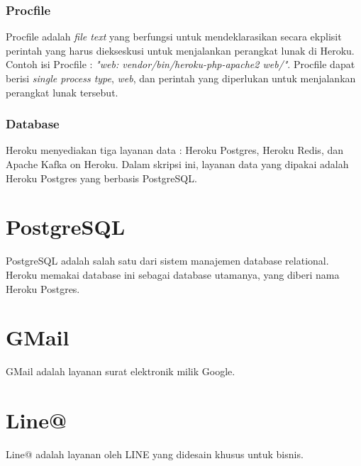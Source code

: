 \subsubsection{Procfile}
Procfile adalah \textit{file text} yang berfungsi untuk mendeklarasikan secara ekplisit perintah yang harus diekseskusi untuk menjalankan perangkat lunak di Heroku. Contoh isi Procfile : \textit{"web: vendor/bin/heroku-php-apache2 web/"}. Procfile dapat berisi \textit{single process type}, \textit{web}, dan perintah yang diperlukan untuk menjalankan perangkat lunak tersebut. \footnotemark[\value{footnote}]

\subsubsection{Database}
Heroku menyediakan tiga layanan data : Heroku Postgres, Heroku Redis, dan Apache Kafka on Heroku. Dalam skripsi ini, layanan data yang dipakai adalah Heroku Postgres yang berbasis PostgreSQL.

\section{PostgreSQL}
\label{sec:PostgreSQL}
PostgreSQL adalah salah satu dari sistem manajemen database relational. Heroku memakai database ini sebagai database utamanya, yang diberi nama Heroku Postgres.

\section{GMail}
\label{sec:GMail}
GMail adalah layanan surat elektronik milik Google.

\section{Line@}
\label{sec:Line@}
Line@ adalah layanan oleh LINE yang didesain khusus untuk bisnis.